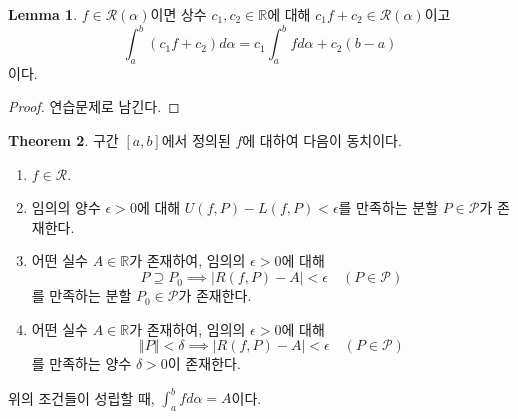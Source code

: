 \documentclass[11pt]{book}
\numberwithin{equation}{chapter}
\def\RR{\mathbb{R}}
\def\eps{\epsilon}
\def\calP{\mathcal{P}}
\def\calR{\mathcal{R}}
\newcommand{\abs}[1]{\left\vert#1\right\vert}
\newcommand{\norm}[1]{\left\Vert#1\right\Vert}
\theoremstyle{definition}
\newtheorem{thm}{Theorem}[section]
\newtheorem{lem}[thm]{Lemma}
\newenvironment{enum}
	{\begin{enumerate}[label=(\alph*), leftmargin=2\parindent]}
	{\end{enumerate}}
\begin{document}
\begin{lem}
    \(f \in \calR(\alpha)\)이면 상수 \(c_1, c_2 \in \RR\)에 대해 \(c_1 f + c_2 \in \calR(\alpha)\)이고
    \[
        \int_a^b (c_1 f + c_2) d\alpha= c_1 \int_a^b f d\alpha + c_2 (b-a)
    \]
    이다.
\end{lem}
\begin{proof}
    연습문제로 남긴다.
\end{proof}

\begin{thm} \label{9.1.15}
    구간 \([a, b]\)에서 정의된 \(f\)에 대하여 다음이 동치이다.
    \begin{enum}
        \item \(f \in \calR\).
        \item 임의의 양수 \(\eps > 0\)에 대해 \(U(f, P) - L(f, P) < \eps\)를 만족하는 분할 \(P \in \calP\)가 존재한다.
        \item 어떤 실수 \(A \in \RR\)가 존재하여, 임의의 \(\eps > 0\)에 대해
        \[
            P \supseteq P_0 \implies \abs{R(f, P) - A} < \eps \quad (P \in \calP)
        \]
        를 만족하는 분할 \(P_0 \in \calP\)가 존재한다.
        \item 어떤 실수 \(A \in \RR\)가 존재하여, 임의의 \(\eps > 0\)에 대해
        \[
            \norm{P} < \delta \implies \abs{R(f, P) - A} < \eps \quad (P \in \calP)
        \]
        를 만족하는 양수 \(\delta > 0\)이 존재한다.
    \end{enum}
    위의 조건들이 성립할 때, \(\displaystyle \int_a^b f d\alpha = A\)이다.
\end{thm}
\end{document}
